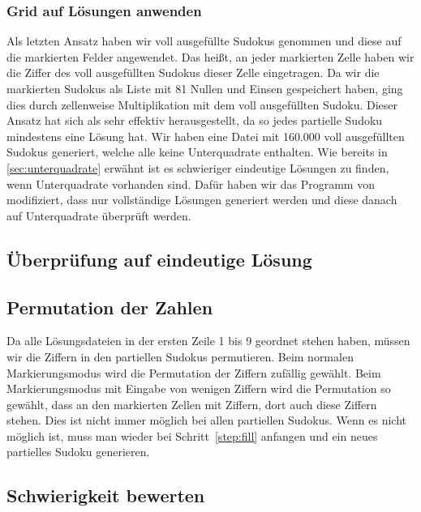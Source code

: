 \subsubsection{Grid auf Lösungen anwenden}
Als letzten Ansatz haben wir voll ausgefüllte Sudokus genommen und diese auf die markierten Felder angewendet.
Das heißt, an jeder markierten Zelle haben wir die Ziffer des voll ausgefüllten Sudokus dieser Zelle eingetragen.
Da wir die markierten Sudokus als Liste mit 81 Nullen und Einsen gespeichert haben,
ging dies durch zellenweise Multiplikation mit dem voll ausgefüllten Sudoku.
Dieser Ansatz hat sich als sehr effektiv herausgestellt, da so jedes partielle Sudoku mindestens eine Lösung hat.
Wir haben eine Datei mit 160.000 voll ausgefüllten Sudokus generiert, welche alle keine Unterquadrate enthalten.
Wie bereits in \cref{sec:unterquadrate} erwähnt ist es schwieriger eindeutige Lösungen zu finden, wenn Unterquadrate vorhanden sind.
Dafür haben wir das Programm von~\cite{stunmuffin_sudoku_generator_2025} modifiziert, dass nur vollständige Lösungen generiert werden
und diese danach auf Unterquadrate überprüft werden.


\subsection{Überprüfung auf eindeutige Lösung}

\subsection{Permutation der Zahlen}
Da alle Lösungsdateien in der ersten Zeile 1 bis 9 geordnet stehen haben, müssen wir die Ziffern in den partiellen Sudokus permutieren.
Beim normalen Markierungsmodus wird die Permutation der Ziffern zufällig gewählt.
Beim Markierungsmodus mit Eingabe von wenigen Ziffern wird die Permutation so gewählt, dass an den markierten Zellen mit Ziffern,
dort auch diese Ziffern stehen.
Dies ist nicht immer möglich bei allen partiellen Sudokus.
Wenn es nicht möglich ist, muss man wieder bei Schritt~\ref{step:fill} anfangen und ein neues partielles Sudoku generieren.


\subsection{Schwierigkeit bewerten}